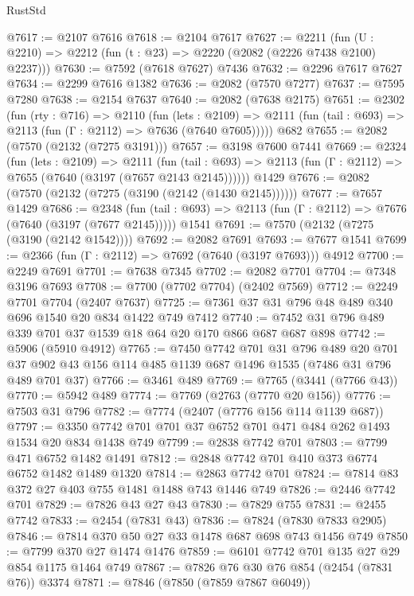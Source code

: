 \begin{lexlean}{RustStd}
\begin{coremodule}
@7617 := @2107 @7616
@7618 := @2104 @7617
@7627 := @2211 (fun (U : @2210) => @2212 (fun (t : @23) => @2220 (@2082 (@2226 @7438 @2100) @2237)))
@7630 := @7592 (@7618 @7627) @7436
@7632 := @2296 @7617 @7627
@7634 := @2299 @7616 @1382
@7636 := @2082 (@7570 @7277)
@7637 := @7595 @7280
@7638 := @2154 @7637
@7640 := @2082 (@7638 @2175)
@7651 := @2302
    (fun (rty : @716) =>
    @2110
      (fun (lets : @2109) =>
      @2111 (fun (tail : @693) => @2113 (fun (Γ : @2112) => @7636 (@7640 @7605)))))
    @682
@7655 := @2082 (@7570 (@2132 (@7275 @3191)))
@7657 := @3198 @7600 @7441
@7669 := @2324
    (fun (lets : @2109) =>
    @2111
      (fun (tail : @693) => @2113 (fun (Γ : @2112) => @7655 (@7640 (@3197 (@7657 @2143 @2145))))))
    @1429
@7676 := @2082 (@7570 (@2132 (@7275 (@3190 (@2142 (@1430 @2145))))))
@7677 := @7657 @1429
@7686 := @2348
    (fun (tail : @693) => @2113 (fun (Γ : @2112) => @7676 (@7640 (@3197 (@7677 @2145)))))
    @1541
@7691 := @7570 (@2132 (@7275 (@3190 (@2142 @1542))))
@7692 := @2082 @7691
@7693 := @7677 @1541
@7699 := @2366 (fun (Γ : @2112) => @7692 (@7640 (@3197 @7693))) @4912
@7700 := @2249 @7691
@7701 := @7638 @7345
@7702 := @2082 @7701
@7704 := @7348 @3196 @7693
@7708 := @7700 (@7702 @7704) (@2402 @7569)
@7712 := @2249 @7701 @7704 (@2407 @7637)
@7725 := @7361 @37 @31 @796 @48 @489 @340 @696 @1540 @20 @834 @1422 @749 @7412
@7740 := @7452 @31 @796 @489 @339 @701 @37 @1539 @18 @64 @20 @170 @866 @687 @687 @898
@7742 := @5906 (@5910 @4912)
@7765 := @7450
    @7742
    @701
    @31
    @796
    @489
    @20
    @701
    @37
    @902
    @43
    @156
    @114
    @485
    @1139
    @687
    @1496
    @1535
    (@7486 @31 @796 @489 @701 @37)
@7766 := @3461 @489
@7769 := @7765 (@3441 (@7766 @43))
@7770 := @5942 @489
@7774 := @7769 (@2763 (@7770 @20 @156))
@7776 := @7503 @31 @796
@7782 := @7774 (@2407 (@7776 @156 @114 @1139 @687))
@7797 := @3350 @7742 @701 @701 @37 @6752 @701 @471 @484 @262 @1493 @1534 @20 @834 @1438 @749
@7799 := @2838 @7742 @701
@7803 := @7799 @471 @6752 @1482 @1491
@7812 := @2848 @7742 @701 @410 @373 @6774 @6752 @1482 @1489 @1320
@7814 := @2863 @7742 @701
@7824 := @7814 @83 @372 @27 @403 @755 @1481 @1488 @743 @1446 @749
@7826 := @2446 @7742 @701
@7829 := @7826 @43 @27 @43
@7830 := @7829 @755
@7831 := @2455 @7742
@7833 := @2454 (@7831 @43)
@7836 := @7824 (@7830 @7833 @2905)
@7846 := @7814 @370 @50 @27 @33 @1478 @687 @698 @743 @1456 @749
@7850 := @7799 @370 @27 @1474 @1476
@7859 := @6101 @7742 @701 @135 @27 @29 @854 @1175 @1464 @749
@7867 := @7826 @76 @30 @76 @854 (@2454 (@7831 @76)) @3374
@7871 := @7846 (@7850 (@7859 @7867 @6049))

\end{coremodule}
\end{lexlean}
